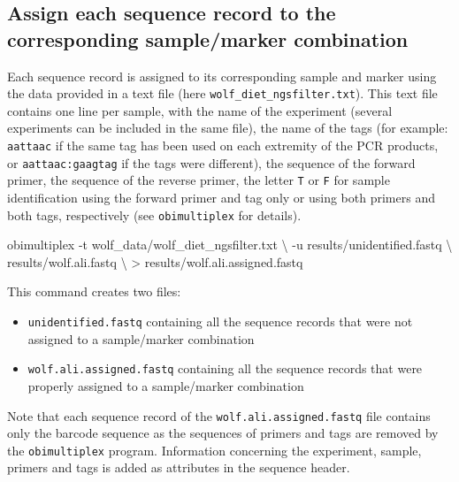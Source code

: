 \documentclass[
  letterpaper,
  DIV=11,
  numbers=noendperiod]{scrreprt}
\newenvironment{Shaded}{\begin{snugshade}}{\end{snugshade}}
\newcommand{\AttributeTok}[1]{\textcolor[rgb]{0.40,0.45,0.13}{#1}}
\newcommand{\DataTypeTok}[1]{\textcolor[rgb]{0.68,0.00,0.00}{#1}}
\newcommand{\ExtensionTok}[1]{\textcolor[rgb]{0.00,0.23,0.31}{#1}}
\newcommand{\NormalTok}[1]{\textcolor[rgb]{0.00,0.23,0.31}{#1}}
\newcommand{\OperatorTok}[1]{\textcolor[rgb]{0.37,0.37,0.37}{#1}}
\providecommand{\tightlist}{%
  \setlength{\itemsep}{0pt}\setlength{\parskip}{0pt}}\usepackage{longtable,booktabs,array}
\begin{document}
\hypertarget{assign-each-sequence-record-to-the-corresponding-samplemarker-combination}{%
\subsection{Assign each sequence record to the corresponding
sample/marker
combination}\label{assign-each-sequence-record-to-the-corresponding-samplemarker-combination}}

Each sequence record is assigned to its corresponding sample and marker
using the data provided in a text file (here
\texttt{wolf\_diet\_ngsfilter.txt}). This text file contains one line
per sample, with the name of the experiment (several experiments can be
included in the same file), the name of the tags (for example:
\texttt{aattaac} if the same tag has been used on each extremity of the
PCR products, or \texttt{aattaac:gaagtag} if the tags were different),
the sequence of the forward primer, the sequence of the reverse primer,
the letter \texttt{T} or \texttt{F} for sample identification using the
forward primer and tag only or using both primers and both tags,
respectively (see \texttt{obimultiplex} for details).

\begin{Shaded}
\begin{Highlighting}[]
\ExtensionTok{obimultiplex} \AttributeTok{{-}t}\NormalTok{ wolf\_data/wolf\_diet\_ngsfilter.txt }\DataTypeTok{\textbackslash{}}
             \AttributeTok{{-}u}\NormalTok{ results/unidentified.fastq }\DataTypeTok{\textbackslash{}}
\NormalTok{             results/wolf.ali.fastq }\DataTypeTok{\textbackslash{}}
             \OperatorTok{\textgreater{}}\NormalTok{ results/wolf.ali.assigned.fastq}
\end{Highlighting}
\end{Shaded}

This command creates two files:

\begin{itemize}
\tightlist
\item
  \texttt{unidentified.fastq} containing all the sequence records that
  were not assigned to a sample/marker combination
\item
  \texttt{wolf.ali.assigned.fastq} containing all the sequence records
  that were properly assigned to a sample/marker combination
\end{itemize}

Note that each sequence record of the \texttt{wolf.ali.assigned.fastq}
file contains only the barcode sequence as the sequences of primers and
tags are removed by the \texttt{obimultiplex} program. Information
concerning the experiment, sample, primers and tags is added as
attributes in the sequence header.
\end{document}
